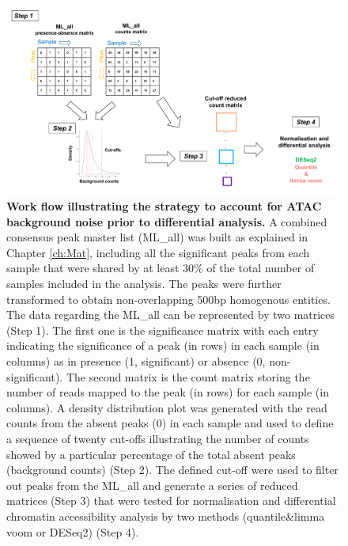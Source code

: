 \begin{landscape}
\begin{figure}[htbp]
\centering
\includegraphics[width=1.2\textwidth]{./Results1/pdfs/ATAC_master_list_filtering_flow_chart}
\caption[Work flow illustrating the strategy to account for ATAC background noise prior to differential analysis.]{\textbf{Work flow illustrating the strategy to account for ATAC background noise prior to differential analysis.} A combined consensus peak master list (ML\_all) was built as explained in Chapter \ref{ch:Mat}, including all the significant peaks from each sample that were shared by at least 30\% of the total number of samples included in the analysis. The peaks were further transformed to obtain non-overlapping 500bp homogenous entities. The data regarding the ML\_all can be represented by two matrices (Step 1). The first one is the significance matrix with each entry indicating the significance of a peak (in rows) in each sample (in columns) as in presence (1, significant) or absence (0, non-significant). The second matrix is the count matrix storing the number of reads mapped to the peak (in rows) for each sample (in columns). A density distribution plot was generated with the read counts from the absent peaks (0) in each sample and used to define a sequence of twenty cut-offs illustrating the number of counts showed by a particular percentage of the total absent peaks (background counts) (Step 2). The defined cut-off were used to filter out peaks from the ML\_all and generate a series of reduced matrices (Step 3) that were tested for normalisation and differential chromatin accessibility analysis by two methods (quantile\&limma voom or DESeq2) (Step 4).}
\label{figure:ML_workflow}
\end{figure}
\end{landscape}



